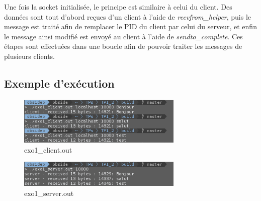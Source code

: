 Une fois la socket initialisée, le principe est similaire à celui du client. Des données sont tout d'abord reçues d'un client à l'aide de \emph{recvfrom\_helper}, puis le message est traité afin de remplacer le PID du client par celui du serveur, et enfin le message ainsi modifié est envoyé au client à l'aide de \emph{sendto\_complete}. Ces étapes sont effectuées dans une boucle afin de pouvoir traiter les messages de plusieurs clients.

\subsection{Exemple d'exécution}
\begin{figure}[h!]
	\centering
	\includegraphics[width=0.7\textwidth]{screenshots/ex1_client.png}
	\caption{exo1\_client.out}
\end{figure}

\begin{figure}[h!]
	\centering
	\includegraphics[width=0.7\textwidth]{screenshots/ex1_server.png}
	\caption{exo1\_server.out}
\end{figure}
